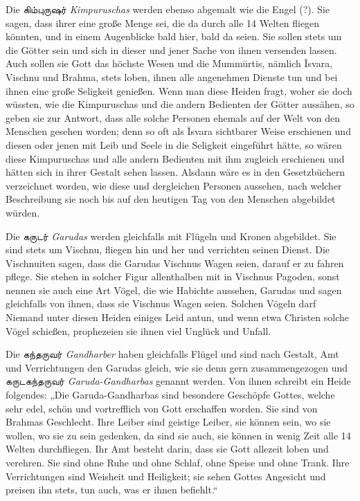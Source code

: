 \documentclass{article}
\newcommand{\TamilText}[1]{\texttamil{#1}}
\newcommand{\tam}[1]{\TamilText{#1}}
\begin{document}
Die \tam{கிம்புருஷர்} \emph{Kimpuruschas} werden ebenso abgemalt wie die Engel (?). Sie sagen, dass ihrer eine große Menge sei, die da durch alle 14 Welten fliegen könnten, und in einem Augenblicke bald hier, bald da seien. Sie sollen stets um die Götter sein und sich in dieser und jener Sache von ihnen versenden lassen. Auch sollen sie Gott das höchste Wesen und die Mumm\={u}rtis, nämlich \={I}svara, Vischnu und Brahma, stets loben, ihnen alle angenehmen Dienste tun und bei ihnen eine große Seligkeit genießen. Wenn man diese Heiden fragt, woher sie doch wüssten, wie die Kimpuruschas und die andern Bedienten der Götter aussähen, so geben sie zur Antwort, dass alle solche Personen ehemals auf der Welt von den Menschen gesehen worden; denn so oft als \={I}svara sichtbarer Weise erschienen und diesen oder jenen mit Leib und Seele in die Seligkeit eingeführt hätte, so wären diese Kimpuruschas und alle andern Bedienten mit ihm zugleich erschienen und hätten sich in ihrer Gestalt sehen lassen. Alsdann wäre es in den Gesetzbüchern verzeichnet worden, wie diese und dergleichen Personen aussehen, nach welcher Beschreibung sie noch bis auf den heutigen Tag von den Menschen abgebildet würden.

Die \tam{கருடர்} \emph{Garudas} werden gleichfalls mit Flügeln und Kronen abgebildet. Sie sind stets um Vischnu, fliegen hin und her und verrichten seinen Dienst. Die Vischnuiten sagen, dass die Garudas Vischnus Wagen seien, darauf er zu fahren pflege. Sie stehen in solcher Figur allenthalben mit in Vischnus Pagoden, sonst nennen sie auch eine Art Vögel, die wie Habichte aussehen, Garudas und sagen gleichfalls von ihnen, dass sie Vischnus Wagen seien. Solchen Vögeln darf Niemand unter diesen Heiden einiges Leid antun, und wenn etwa Christen solche Vögel schießen, prophezeien sie ihnen viel Unglück und Unfall.

Die \tam{கந்தருவர்} \emph{Gandharber} haben gleichfalls Flügel und sind nach Gestalt, Amt und Verrichtungen den Garudas gleich, wie sie denn gern zusammengezogen und \tam{கருடகந்தருவர்} \emph{Garuda-Gandharbas} genannt werden. Von ihnen schreibt ein Heide folgendes: „Die Garuda-Gandharbas sind besondere Geschöpfe Gottes, welche sehr edel, schön und vortrefflich von Gott erschaffen worden. Sie sind von Brahmas Geschlecht. Ihre Leiber sind geistige Leiber, sie können sein, wo sie wollen, wo sie zu sein gedenken, da sind sie auch, sie können in wenig Zeit alle 14 Welten durchfliegen. Ihr Amt besteht darin, dass sie Gott allezeit loben und verehren. Sie sind ohne Ruhe und ohne Schlaf, ohne Speise und ohne Trank. Ihre Verrichtungen sind Weisheit und Heiligkeit; sie sehen Gottes Angesicht und preisen ihn stets, tun auch, was er ihnen befiehlt.“
\end{document}

